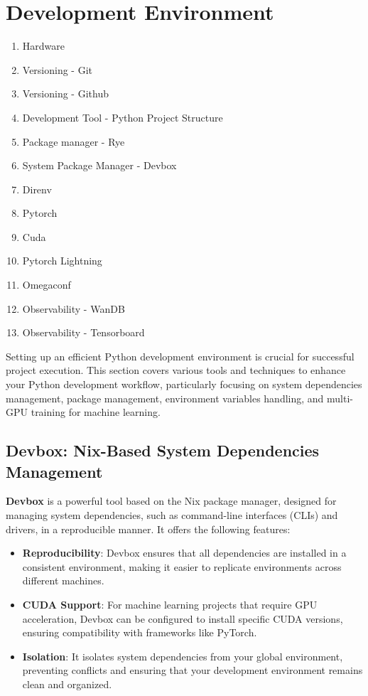 \section{Development Environment}


\begin{enumerate}
    \item Hardware
    \item Versioning - Git
    \item Versioning - Github
    \item Development Tool - Python
    \itme Project Structure
    \item Package manager - Rye
    \item System Package Manager - Devbox
    \item Direnv
    \item Pytorch
    \item Cuda
    \item Pytorch Lightning
    \item Omegaconf
    \item Observability - WanDB
    \item Observability - Tensorboard
\end{enumerate}


Setting up an efficient Python development environment is crucial for successful project execution. This section covers various tools and techniques to enhance your Python development workflow, particularly focusing on system dependencies management, package management, environment variables handling, and multi-GPU training for machine learning.

\subsection{Devbox: Nix-Based System Dependencies Management}

\textbf{Devbox} is a powerful tool based on the Nix package manager, designed for managing system dependencies, such as command-line interfaces (CLIs) and drivers, in a reproducible manner. It offers the following features:

\begin{itemize}
    \item \textbf{Reproducibility}: Devbox ensures that all dependencies are installed in a consistent environment, making it easier to replicate environments across different machines.
    \item \textbf{CUDA Support}: For machine learning projects that require GPU acceleration, Devbox can be configured to install specific CUDA versions, ensuring compatibility with frameworks like PyTorch.
    \item \textbf{Isolation}: It isolates system dependencies from your global environment, preventing conflicts and ensuring that your development environment remains clean and organized.
\end{itemize}

